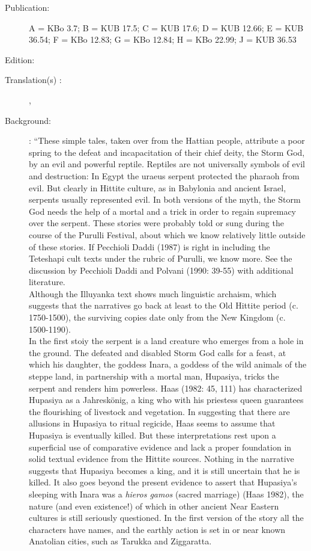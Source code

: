 \documentclass[10pt]{article}
\renewcommand{\.}[1]{\textsubdot{#1}}
\begin{document}
\begin{description}

\item[Publication:] A = KBo 3.7; B = KUB 17.5; C = KUB 17.6; D = KUB 12.66; E = KUB 36.54; F = KBo 12.83; G = KBo 12.84; H = KBo 22.99; J = KUB 36.53
\item[Edition:] \citet{beckman1982illuyanka}
\item[Translation(s) :] \citet{beckman1982illuyanka}, \citet[12]{hoffner1998myths}
\item[Background:] \citet[10--13]{hoffner1998myths}: 
``These simple tales, taken over from the Hattian people, attribute a poor spring to the defeat and incapacitation of their chief deity, the Storm God, by an evil and powerful reptile. Reptiles are not universally symbols of evil and destruction: In Egypt the uraeus serpent protected the pharaoh from evil. But clearly in Hittite culture, as in Babylonia and ancient Israel, serpents usually represented evil. In both versions of the myth, the Storm God needs the help of a mortal and a trick in order to regain supremacy over the serpent. These stories were probably told or sung during the course of the Purulli Festival, about which we know relatively little outside of these stories. If Pecchioli Daddi (1987) is right in including the Teteshapi cult texts under the rubric of Purulli, we know more. See the discussion by Pecchioli Daddi and Polvani (1990: 39-55) with additional literature. \\

Although the Illuyanka text shows much linguistic archaism, which suggests that the narratives go back at least to the Old Hittite period (c. 1750-1500), the surviving copies date only from the New Kingdom (c. 1500-1190). \\

In the first stoiy the serpent is a land creature who emerges from a hole in the ground. The defeated and disabled Storm God calls for a feast, at which his daughter, the goddess Inara, a goddess of the wild animals of the steppe land, in partnership with a mortal man, Hupasiya, tricks the serpent and renders him powerless. Haas (1982: 45, 111) has characterized Hupasiya as a Jahreskönig, a king who with his priestess queen guarantees the flourishing of livestock and vegetation. In suggesting that there are allusions in Hupasiya to ritual regicide, Haas seems to assume that Hupasiya is eventually killed. But these interpretations rest upon a superficial use of comparative evidence and lack a proper foundation in solid textual evidence from the Hittite sources. Nothing in the narrative suggests that Hupasiya becomes a king, and it is still uncertain that he is killed. It also goes beyond the present evidence to assert that Hupasiya's sleeping with Inara was a \textit{hieros gamos} (sacred marriage) (Haas 1982), the nature (and even existence!) of which in other ancient Near Eastern cultures is still seriously questioned. In the first version of the story all the characters have names, and the earthly action is set in or near known Anatolian cities, such as Tarukka and Ziggaratta. \\


\end{description}
\end{document}
